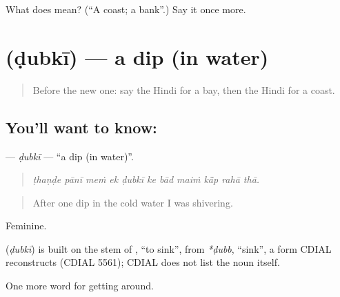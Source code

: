 \begin{tcolorbox}[breakable,colback=teal!4,colframe=teal!35!black,title={Before you move on}]
What does  mean? (\textquotedblleft{}A coast; a bank\textquotedblright{}.) Say it once more.
\end{tcolorbox}
\section[\texorpdfstring{\hi{डुबकी} (ḍubkī)}{डुबकी (ḍubkī)}]{ (ḍubkī) — a dip (in water)}

\label{lesson:HI-C444-dubki}



\begin{quote}
Before the new one: say the Hindi for a bay, then the Hindi for a coast.
\end{quote}

\subsection*{You'll want to know: }
\textbf{} — \emph{ḍubkī} — \textquotedblleft{}a dip (in water)\textquotedblright{}.

\begin{quote}
          
\end{quote}

\begin{quote}
\emph{ṭhaṇḍe pānī meṁ ek ḍubkī ke bād maiṁ kā̃p rahā thā.}
\end{quote}

\begin{quote}
After one dip in the cold water I was shivering.
\end{quote}

Feminine.

\begin{cousinweb}
\textbf{} (\emph{ḍubkī}) is built on the stem of , \textquotedblleft{}to sink\textquotedblright{}, from \emph{*ḍubb}, \textquotedblleft{}sink\textquotedblright{}, a form CDIAL reconstructs (CDIAL 5561); CDIAL does not list the noun itself.
\end{cousinweb}

\begin{grammarlens}[title={What you've built}]
One more word for getting around.
\end{grammarlens}


